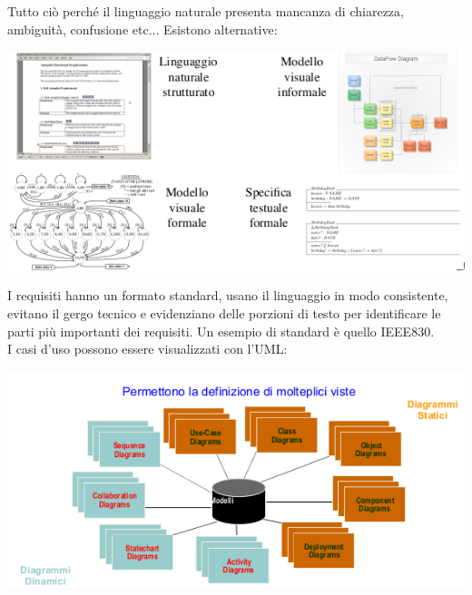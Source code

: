 \documentclass[a4paper,12pt, oneside]{book}
\begin{document}
\newpage
Tutto ciò perché il linguaggio naturale presenta mancanza di chiarezza, ambiguità, confusione etc... Esistono alternative:
\begin{center}
	\includegraphics[scale=0.8]{img/req2.png}
\end{center}
I requisiti hanno un formato standard, usano il linguaggio in modo consistente, evitano il gergo tecnico e evidenziano delle porzioni di testo per identificare le parti più importanti dei requisiti. Un esempio di standard è quello IEEE830.\\
I casi d'uso possono essere visualizzati con l'UML:
\begin{center}
	\includegraphics[scale=0.8]{img/uml.png}
\end{center}
\end{document}
